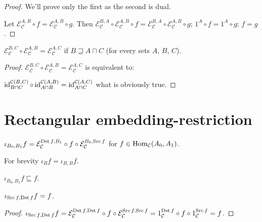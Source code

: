 \begin{proof}
  We'll prove only the first as the second is dual.
  
  Let $\mathcal{E}_{\mathcal{C}}^{A,B} \circ f = \mathcal{E}_{\mathcal{C}}^{A,B} \circ g$. Then
  $\mathcal{E}_{\mathcal{C}}^{B,A} \circ \mathcal{E}_{\mathcal{C}}^{A,B}
  \circ f = \mathcal{E}_{\mathcal{C}}^{B,A} \circ \mathcal{E}_{\mathcal{C}}^{A,B} \circ g$;
  $1^A \circ f = 1^A \circ g$; $f = g$.
\end{proof}

\begin{prop}
  $\mathcal{E}_{\mathcal{C}}^{B,C} \circ \mathcal{E}_{\mathcal{C}}^{A,B} = \mathcal{E}_{\mathcal{C}}^{A,C}$
  if $B \sqsupseteq A \sqcap C$ (for every sets $A$, $B$, $C$).
\end{prop}

\begin{proof}
  $\mathcal{E}_{\mathcal{C}}^{B,C} \circ \mathcal{E}_{\mathcal{C}}^{A,B} = \mathcal{E}_{\mathcal{C}}^{A,C}$
  is equivalent to:
  
  $\operatorname{id}^{\mathcal{C}(B,C)}_{B \sqcap C} \circ \operatorname{id}^{\mathcal{C}(A,B)}_{A \sqcap B} = \operatorname{id}^{\mathcal{C}(A,C)}_{A \sqcap C}$ what is obviously true.
\end{proof}

\section{Rectangular embedding-restriction}

\begin{defn}
  $\iota_{B_0, B_1} f = \mathcal{E}_{\mathcal{C}}^{\operatorname{Dst} f,B_1} \circ f \circ
  \mathcal{E}_{\mathcal{C}}^{B_0,\operatorname{Src} f}$ for $f \in
  \operatorname{Hom}_{\mathcal{C}} (A_0 , A_1)$.
\end{defn}

For brevity $\iota_B f = \iota_{B, B} f$.

\begin{obvious}
$\iota_{B_0, B_1} f\sqsubseteq f$.
\end{obvious}

\begin{prop}
  $\iota_{\operatorname{Src} f, \operatorname{Dst} f} f = f$.
\end{prop}

\begin{proof}
  $\iota_{\operatorname{Src} f, \operatorname{Dst} f} f = \mathcal{E}_\mathcal{C}^{\operatorname{Dst} f,\operatorname{Dst} f} \circ f \circ \mathcal{E}_\mathcal{C}^{\operatorname{Src} f,\operatorname{Src} f} =
  1_{\mathcal{C}}^{\operatorname{Dst} f} \circ f \circ 1_{\mathcal{C}}^{\operatorname{Src} f} = f$.
\end{proof}

